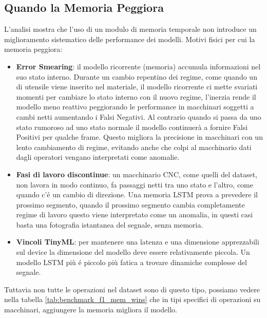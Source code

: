 \subsection{Quando la Memoria Peggiora}
L'analisi mostra che l'uso di un modulo di memoria temporale non introduce un miglioramento sistematico delle performance dei modelli.
Motivi fisici per cui la memoria peggiora:
\begin{itemize}
	\item  \textbf{Error Smearing}: il modello ricorrente (memoria) accumula informazioni nel suo stato interno. Durante un cambio repentino dei regime, come quando un di utensile viene inserito nel materiale, il modello ricorrente ci mette svariati momenti per cambiare lo stato interno con il nuovo regime, l'inerzia rende il modello meno reattivo peggiorando le performance in macchinari soggetti a cambi netti aumentando i Falsi Negativi. Al contrario quando si passa da uno stato rumoroso ad uno stato normale il modello continuerà a fornire Falsi Positivi per qualche frame.
	Questo migliora la precisione in macchinari con un lento cambiamento di regime, evitando anche che colpi al macchinario dati dagli operatori vengano interpretati come anomalie.
	
	\item \textbf{Fasi di lavoro discontinue}: un macchinario CNC, come quelli del dataset, non lavora in modo continuo, fa passaggi netti tra uno stato e l'altro, come quando c'é un cambio di direzione. Una memoria LSTM prova a prevedere il prossimo segmento, quando il prossimo segmento cambia completamente regime di lavoro questo viene interpretato come un anomalia, in questi casi basta una fotografia istantanea del segnale, senza memoria.
	
	\item \textbf{Vincoli TinyML}: per mantenere una latenza e una dimensione apprezzabili sul device la dimensione del modello deve essere relativamente piccola. Un modello LSTM più é piccolo più fatica a trovare dinamiche complesse del segnale.
	
\end{itemize}

Tuttavia non tutte le operazioni nel dataset sono di questo tipo, possiamo vedere nella tabella \ref{tab:benchmark_f1_mem_wins} che in tipi specifici di operazioni su macchinari, aggiungere la memoria migliora il modello.

